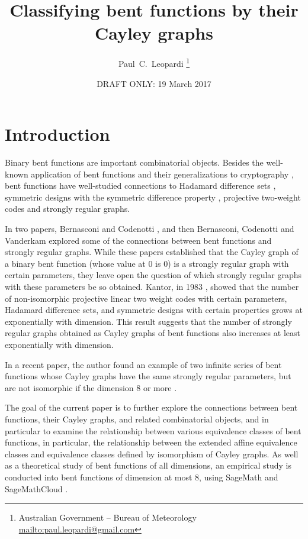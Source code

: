 \documentclass[12pt,a4paper]{article}
\title{Classifying bent functions by their Cayley graphs}
\author{
Paul~C.~Leopardi
\thanks{Australian Government -- Bureau of Meteorology
\protect\url{mailto:paul.leopardi@gmail.com}}
}
\date{DRAFT ONLY: 19 March 2017}
\begin{document}
\maketitle

\begin{abstract}
%
%
\end{abstract}

\section{Introduction}
\label{sec-Introduction}
Binary bent functions are important combinatorial objects.
Besides the well-known application of bent functions and their generalizations to cryptography
\cite{Ada97} \cite[4.1-4.6]{Tok15bent},
bent functions have well-studied connections to Hadamard difference sets \cite{Dil74},
symmetric designs with the symmetric difference property \cite{DilS87block,Kan75symplectic},
projective two-weight codes \cite{DinD15class} and strongly regular graphs.

In two papers, Bernasconi and Codenotti \cite{BerC99}, and then Bernasconi, Codenotti and Vanderkam \cite{BerCV01} explored some of the connections
between bent functions and strongly regular graphs.
While these papers established that the Cayley graph of a binary bent function (whose value at 0 is 0) is a strongly regular graph
with certain parameters, they leave open the question of which strongly regular graphs with these parameters  be so obtained.
Kantor, in 1983 \cite{Kan83exponential}, showed that the number of non-isomorphic projective linear two weight codes with certain parameters,
Hadamard difference sets, and symmetric designs with certain properties grows at exponentially with dimension.
This result suggests that the number of strongly regular graphs obtained as Cayley graphs of bent functions also increases at least exponentially with dimension.

In a recent paper, the author found an example of two infinite series of bent functions whose Cayley graphs have the same strongly regular parameters,
but are not isomorphic if the dimension 8 or more \cite{Leo17Hurwitz}.

The goal of the current paper is to further explore the connections between bent functions, their Cayley graphs, and related combinatorial objects,
and in particular to examine the relationship between various equivalence classes of bent functions, in particular, the relationship between the extended affine
equivalence classes and equivalence classes defined by isomorphism of Cayley graphs.
As well as a theoretical study of bent functions of all dimensions, an empirical study is conducted
into bent functions of dimension at most 8,
using SageMath \cite{SageMath7517} and SageMathCloud \cite{SageMathCloud}.
\end{document}
